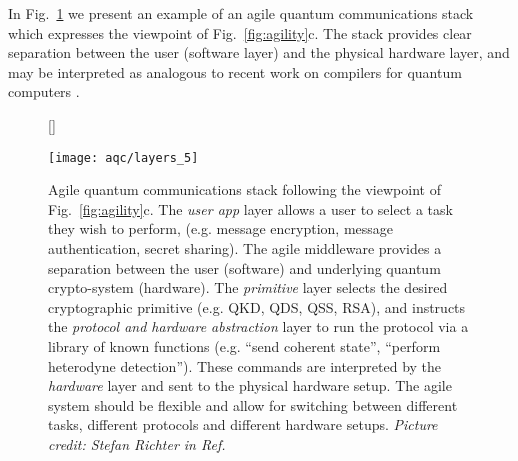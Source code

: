
In Fig.~\ref{fig:big_agile} we present an example of an agile quantum communications stack which expresses the viewpoint of Fig.~\ref{fig:agility}c. The stack provides clear separation between the user (software layer) and the physical hardware layer, and may be interpreted as analogous to recent work on compilers for quantum computers \cite{Killoran2018, qiskit, Murali2019}.

\begin{figure}[htp]
[\FBwidth]
{\caption{\label{fig:big_agile} Agile quantum communications stack following the viewpoint of Fig.~\ref{fig:agility}c. The \emph{user app} layer allows a user to select a task they wish to perform, (e.g. message encryption, message authentication, secret sharing). The agile middleware provides a separation between the user (software) and underlying quantum crypto-system (hardware). The \emph{primitive} layer selects the desired cryptographic primitive (e.g. QKD, QDS, QSS, RSA), and instructs the \emph{protocol and hardware abstraction} layer to run the protocol via a library of known functions (e.g. ``send coherent state'', ``perform heterodyne detection''). These commands are interpreted by the \emph{hardware} layer and sent to the physical hardware setup. The agile system should be flexible and allow for switching between different tasks, different protocols and different hardware setups. \emph{Picture credit: Stefan Richter in Ref.~\cite{Richter2020}}}}
{\texttt{[image: aqc/layers\_5]}}
\end{figure}


\iffalse
\begin{figure}[htp]
\centering
\texttt{[image: aqc/layers\_5]}
\caption{\label{fig:big_agile} Agile quantum communications stack following the viewpoint of Fig.~\ref{fig:agility}c. The \emph{user app} layer allows a user to select a task they wish to perform, (e.g. message encryption, message authentication, secret sharing). The agile middleware provides a separation between the user (software) and underlying quantum crypto-system (hardware). The \emph{primitive} layer selects the desired cryptographic primitive (e.g. QKD, QDS, QSS, RSA), and instructs the \emph{protocol and hardware abstraction} layer to run the protocol via a library of known functions (e.g. ``send coherent state'', ``perform heterodyne detection''). These commands are interpreted by the \emph{hardware} layer and sent to the physical hardware setup. The agile system should be flexible and allow for switching between different tasks, different protocols and different hardware setups. \emph{Picture credit: Stefan Richter in Ref.~\cite{Richter2020}}}
\end{figure}
\fi

